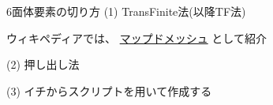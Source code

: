 \begin{frame}{6面体要素の切り方}
	(1) TransFinite法(以降TF法)
	    
	    ウィキペディアでは、 { \color{cud_orange}
                                   \href{https://ja.wikipedia.org/wiki/マップドメッシュ}
                                   {マップドメッシュ}} として紹介 

	(2) 押し出し法

	(3) イチからスクリプトを用いて作成する
\end{frame}
